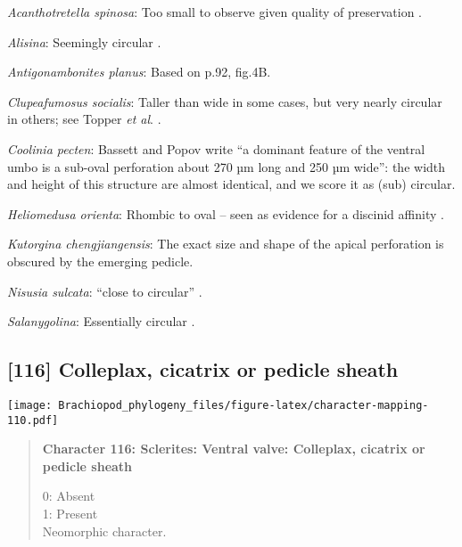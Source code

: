 \documentclass[openany]{book}
\theoremstyle{definition}
\theoremstyle{definition}
\theoremstyle{definition}
\theoremstyle{remark}
\begin{document}
\hypertarget{Acanthotretella_spinosa-coding-115}{}
\emph{Acanthotretella spinosa}: Too small to observe given quality of
preservation \citep{Holmer2006Aspinose}.

\hypertarget{Alisina-coding-115}{}
\emph{Alisina}: Seemingly circular \citep{Zhang2011Anobolellate}.

\hypertarget{Antigonambonites_planus-coding-115}{}
\emph{Antigonambonites planus}: Based on p.92, fig.4B.

\hypertarget{Clupeafumosus_socialis-coding-115}{}
\emph{Clupeafumosus socialis}: Taller than wide in some cases, but very
nearly circular in others; see Topper \emph{et al}.
\citeyearpar{Topper2013Reappraisalof}.

\hypertarget{Coolinia_pecten-coding-115}{}
\emph{Coolinia pecten}: Bassett and Popov write ``a dominant feature of
the ventral umbo is a sub-oval perforation about 270 µm long and 250 µm
wide'': the width and height of this structure are almost identical, and
we score it as (sub) circular.

\hypertarget{Heliomedusa_orienta-coding-115}{}
\emph{Heliomedusa orienta}: Rhombic to oval -- seen as evidence for a
discinid affinity \citep{Chen2007Reinterpretationof}.

\hypertarget{Kutorgina_chengjiangensis-coding-115}{}
\emph{Kutorgina chengjiangensis}: The exact size and shape of the apical
perforation is obscured by the emerging pedicle.

\hypertarget{Nisusia_sulcata-coding-115}{}
\emph{Nisusia sulcata}: ``close to circular''
\citep{Holmer2018Evolutionarysignificance}.

\hypertarget{Salanygolina-coding-115}{}
\emph{Salanygolina}: Essentially circular \citep[fig.
4]{Holmer2009Theenigmatic}.

\subsection*{{[}116{]} Colleplax, cicatrix or pedicle
sheath}\label{colleplax-cicatrix-or-pedicle-sheath}

\texttt{[image: Brachiopod\_phylogeny\_files/figure-latex/character-mapping-110.pdf]}

\begin{quote}
\textbf{Character 116: Sclerites: Ventral valve: Colleplax, cicatrix or
pedicle sheath}

0: Absent\\
1: Present\\
Neomorphic character.
\end{quote}
\end{document}
